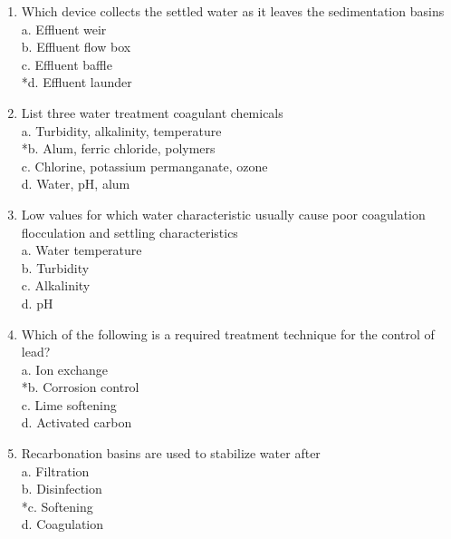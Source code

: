 \begin{enumerate}
\item Which device collects the settled water as it leaves the sedimentation basins\\
a.	Effluent weir\\
b.	Effluent flow box\\
c. Effluent baffle\\
*d.  Effluent launder\\
\item List three water treatment coagulant chemicals\\
a.	Turbidity, alkalinity, temperature\\
*b.	Alum, ferric chloride, polymers\\
c.	Chlorine, potassium permanganate, ozone\\
d.	Water, pH, alum\\
\item Low values for which water characteristic usually cause poor coagulation flocculation and settling characteristics\\
a.	Water temperature\\
b.	Turbidity\\
c.	Alkalinity\\
d.	pH\\
\item Which of the following is a required treatment technique for the control of lead?\\
a.	Ion exchange\\
*b.	Corrosion control\\
c.	Lime softening\\
d.	Activated carbon\\
\item Recarbonation basins are used to stabilize water after\\
a.	Filtration\\
b.	Disinfection\\
*c.  Softening\\
d.	Coagulation\\

\end{enumerate}

